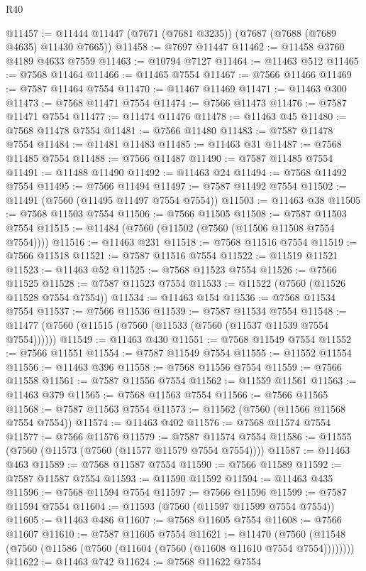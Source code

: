 \begin{lexlean}{R40}
\begin{coremodule}
@11457 := @11444 @11447 (@7671 (@7681 @3235)) (@7687 (@7688 (@7689 @4635) @11430 @7665))
@11458 := @7697 @11447
@11462 := @11458 @3760 @4189 @4633 @7559
@11463 := @10794 @7127
@11464 := @11463 @512
@11465 := @7568 @11464
@11466 := @11465 @7554
@11467 := @7566 @11466
@11469 := @7587 @11464 @7554
@11470 := @11467 @11469
@11471 := @11463 @300
@11473 := @7568 @11471 @7554
@11474 := @7566 @11473
@11476 := @7587 @11471 @7554
@11477 := @11474 @11476
@11478 := @11463 @45
@11480 := @7568 @11478 @7554
@11481 := @7566 @11480
@11483 := @7587 @11478 @7554
@11484 := @11481 @11483
@11485 := @11463 @31
@11487 := @7568 @11485 @7554
@11488 := @7566 @11487
@11490 := @7587 @11485 @7554
@11491 := @11488 @11490
@11492 := @11463 @24
@11494 := @7568 @11492 @7554
@11495 := @7566 @11494
@11497 := @7587 @11492 @7554
@11502 := @11491 (@7560 (@11495 @11497 @7554 @7554))
@11503 := @11463 @38
@11505 := @7568 @11503 @7554
@11506 := @7566 @11505
@11508 := @7587 @11503 @7554
@11515 := @11484 (@7560 (@11502 (@7560 (@11506 @11508 @7554 @7554))))
@11516 := @11463 @231
@11518 := @7568 @11516 @7554
@11519 := @7566 @11518
@11521 := @7587 @11516 @7554
@11522 := @11519 @11521
@11523 := @11463 @52
@11525 := @7568 @11523 @7554
@11526 := @7566 @11525
@11528 := @7587 @11523 @7554
@11533 := @11522 (@7560 (@11526 @11528 @7554 @7554))
@11534 := @11463 @154
@11536 := @7568 @11534 @7554
@11537 := @7566 @11536
@11539 := @7587 @11534 @7554
@11548 := @11477 (@7560 (@11515 (@7560 (@11533 (@7560 (@11537 @11539 @7554 @7554))))))
@11549 := @11463 @430
@11551 := @7568 @11549 @7554
@11552 := @7566 @11551
@11554 := @7587 @11549 @7554
@11555 := @11552 @11554
@11556 := @11463 @396
@11558 := @7568 @11556 @7554
@11559 := @7566 @11558
@11561 := @7587 @11556 @7554
@11562 := @11559 @11561
@11563 := @11463 @379
@11565 := @7568 @11563 @7554
@11566 := @7566 @11565
@11568 := @7587 @11563 @7554
@11573 := @11562 (@7560 (@11566 @11568 @7554 @7554))
@11574 := @11463 @402
@11576 := @7568 @11574 @7554
@11577 := @7566 @11576
@11579 := @7587 @11574 @7554
@11586 := @11555 (@7560 (@11573 (@7560 (@11577 @11579 @7554 @7554))))
@11587 := @11463 @463
@11589 := @7568 @11587 @7554
@11590 := @7566 @11589
@11592 := @7587 @11587 @7554
@11593 := @11590 @11592
@11594 := @11463 @435
@11596 := @7568 @11594 @7554
@11597 := @7566 @11596
@11599 := @7587 @11594 @7554
@11604 := @11593 (@7560 (@11597 @11599 @7554 @7554))
@11605 := @11463 @486
@11607 := @7568 @11605 @7554
@11608 := @7566 @11607
@11610 := @7587 @11605 @7554
@11621 := @11470
    (@7560 (@11548 (@7560 (@11586 (@7560 (@11604 (@7560 (@11608 @11610 @7554 @7554))))))))
@11622 := @11463 @742
@11624 := @7568 @11622 @7554

\end{coremodule}
\end{lexlean}
